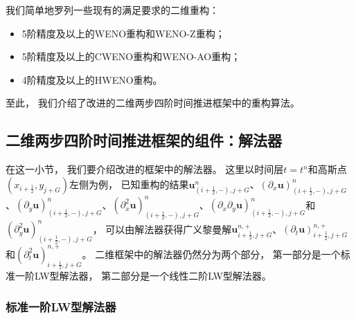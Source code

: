 我们简单地罗列一些现有的满足要求的二维重构：
\begin{itemize}
  \item 5阶精度及以上的WENO重构和WENO-Z重构；
  \item 5阶精度及以上的CWENO重构和WENO-AO重构；
  \item 4阶精度及以上的HWENO重构。
\end{itemize}

至此，
我们介绍了改进的二维两步四阶时间推进框架中的重构算法。

\subsection{二维两步四阶时间推进框架的组件：解法器}
\label{sec:2D-Solver}

在这一小节，
我们要介绍改进的框架中的解法器。
这里以时间层$t=t^n$和高斯点$(x_{i+\frac{1}{2}},y_{j+G})$左侧为例，
已知重构的结果${\bm{u}}_{(i+\frac{1}{2},-),j+G}^n$、$\left({\partial_{x}}{\bm{u}}\right)_{(i+\frac{1}{2},-),j+G}^n$、$\left({\partial_{y}}{\bm{u}}\right)_{(i+\frac{1}{2},-),j+G}^n$、$\left({\partial_{x}^2}{\bm{u}}\right)_{(i+\frac{1}{2},-),j+G}^n$、$\left({\partial_{x}}{\partial_{y}}{\bm{u}}\right)_{(i+\frac{1}{2},-),j+G}^n$和$\left({\partial_{y}^2}{\bm{u}}\right)_{(i+\frac{1}{2},-),j+G}^n$，
可以由解法器获得广义黎曼解${\bm{u}}_{i+\frac{1}{2},j+G}^{n, +}$、$\left({\partial_{t}}{\bm{u}}\right)_{i+\frac{1}{2},j+G}^{n, +}$和$\left({\partial_{t}^2}{\bm{u}}\right)_{i+\frac{1}{2},j+G}^{n, +}$。
二维框架中的解法器仍然分为两个部分，
第一部分是一个标准一阶LW型解法器，
第二部分是一个线性二阶LW型解法器。

\subsubsection{标准一阶LW型解法器}

